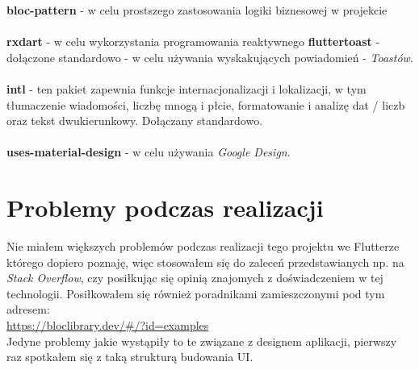 \documentclass[12pt,a4paper]{article}
\begin{document}
\textbf{bloc-pattern} - w celu prostszego zastosowania logiki biznesowej w projekcie \\ \\
\textbf{rxdart} - w celu wykorzystania programowania reaktywnego 
\textbf{fluttertoast} - dołączone standardowo - w celu używania wyskakujących powiadomień - \textit{Toastów}. \\ \\
\textbf{intl} - ten pakiet zapewnia funkcje internacjonalizacji i lokalizacji, w tym tłumaczenie wiadomości, liczbę mnogą i płcie, formatowanie i analizę dat / liczb oraz tekst dwukierunkowy. Dołączany standardowo. \\ \\
\textbf{uses-material-design} - w celu używania \textit{Google Design}.
    
	\section{Problemy podczas realizacji}
Nie miałem większych problemów podczas realizacji tego projektu we Flutterze którego dopiero poznaję, więc stosowałem się do zaleceń przedstawianych np. na\textit{ Stack Overflow}, czy posiłkując się opinią znajomych z doświadczeniem w tej technologii. Posiłkowałem się również poradnikami zamieszczonymi pod tym adresem: \\ \url{https://bloclibrary.dev/#/?id=examples} \\
Jedyne problemy jakie wystąpiły to te związane z designem aplikacji, pierwszy raz spotkałem się z taką strukturą budowania UI.
	
    \newpage
    
\end{document}
